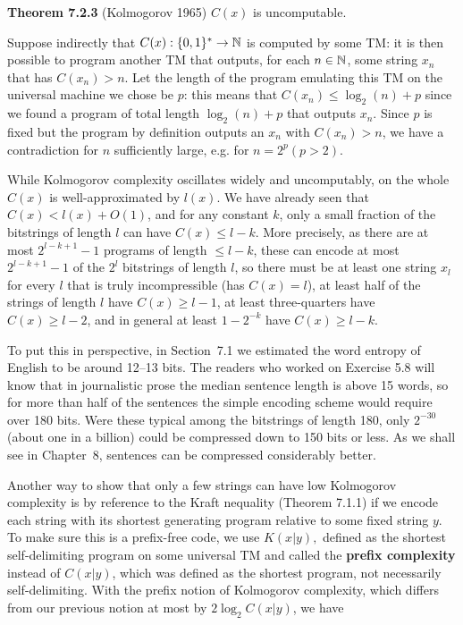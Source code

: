 \smallskip\noindent
{\bf Theorem 7.2.3} (Kolmogorov 1965) $C(x)$ is uncomputable. 

\smallskip{} Suppose indirectly that $C(x): \{0,1\}^*
\rightarrow {\Bbb N}$ is computed by some TM: it is then possible to program
another TM that outputs, for each $n \in {\Bbb N}$, some string $x_n$ that has
$C(x_n) > n$. Let the length of the program emulating this TM on the universal
machine we chose be $p$: this means that $C(x_n) \leq \log_2(n) +p$ since we
found a program of total length $\log_2(n) +p$ that outputs $x_n$. Since $p$
is fixed but the program by definition outputs an $x_n$ with $C(x_n) > n$, we
have a contradiction for $n$ sufficiently large, e.g. for $n = 2^p (p >2)$.

\medskip\noindent While Kolmogorov complexity oscillates widely and
uncomputably, on the whole $C(x)$ is well-approximated by $l(x)$.  We have
already seen that $C(x) < l(x) +O(1)$, and for any constant $k$, only a small
fraction of the bitstrings of length $l$ can have $C(x) \leq l-k$. More
precisely, as there are at most $2^{l-k+1}-1$ programs of length $\leq l-k$,
these can encode at most $2^{l-k+1}-1$ of the $2^l$ bitstrings of length $l$,
so there must be at least one string $x_l$ for every $l$ that is truly
incompressible (has $C(x)=l$), at least half of the strings of length $l$ have
$C(x) \geq l-1$, at least three-quarters have $C(x) \geq l-2$, and in general
at least $1-2^{-k}$ have $C(x)\geq l-k$.

To put this in perspective, in Section~7.1 we estimated the word entropy of
English to be around 12--13 bits. The readers who worked on Exercise 5.8 will
know that in journalistic prose the median sentence length is above 15 words,
so for more than half of the sentences the simple encoding scheme would
require over 180 bits. Were these typical among the bitstrings of length 180,
only $2^{-30}$ (about one in a billion) could be compressed down to 150 bits
or less. As we shall see in Chapter~8, sentences can be compressed
considerably better.

Another way to show that only a few strings can have low Kolmogorov complexity
is by reference to the Kraft nequality (Theorem 7.1.1) if we encode each
string with its shortest generating program relative to some fixed string $y$.
To make sure this is a prefix-free code, we use $K(x|y),$ defined as the
shortest self-delimiting program on some universal TM and called the {\bf
  prefix complexity} instead of $C(x|y)$, which was
defined as the shortest program, not necessarily self-delimiting.  With the
prefix notion of Kolmogorov complexity, which differs from our previous notion
at most by $2\log_2 C(x|y)$, we have

